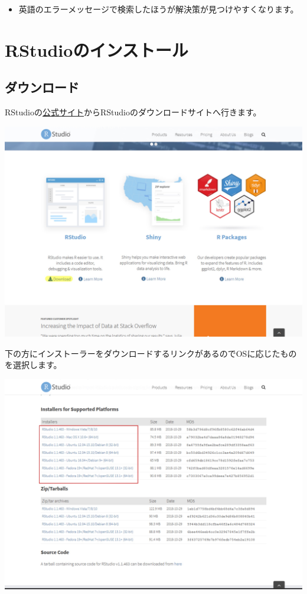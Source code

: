 \documentclass[]{bxjsreport}
\providecommand{\tightlist}{%
  \setlength{\itemsep}{0pt}\setlength{\parskip}{0pt}}
\let\asdf\section
\renewcommand{\section}{\chapter}
\let\asdff\subsection
\renewcommand{\subsection}{\asdf}
\renewcommand{\subsubsection}{\asdff}
\begin{document}
\begin{itemize}
\tightlist
\item
  英語のエラーメッセージで検索したほうが解決策が見つけやすくなります。
\end{itemize}

\hypertarget{rstudioux306eux30a4ux30f3ux30b9ux30c8ux30fcux30eb}{%
\subsection{RStudioのインストール}\label{rstudioux306eux30a4ux30f3ux30b9ux30c8ux30fcux30eb}}

\hypertarget{ux30c0ux30a6ux30f3ux30edux30fcux30c9-1}{%
\subsubsection{ダウンロード}\label{ux30c0ux30a6ux30f3ux30edux30fcux30c9-1}}

RStudioの\href{https://www.rstudio.com/}{公式サイト}からRStudioのダウンロードサイトへ行きます。

\includegraphics{figures/Rstudio1.jpg}

下の方にインストーラーをダウンロードするリンクがあるのでOSに応じたものを選択します。

\includegraphics{figures/Rstudio2.jpg}
\end{document}
